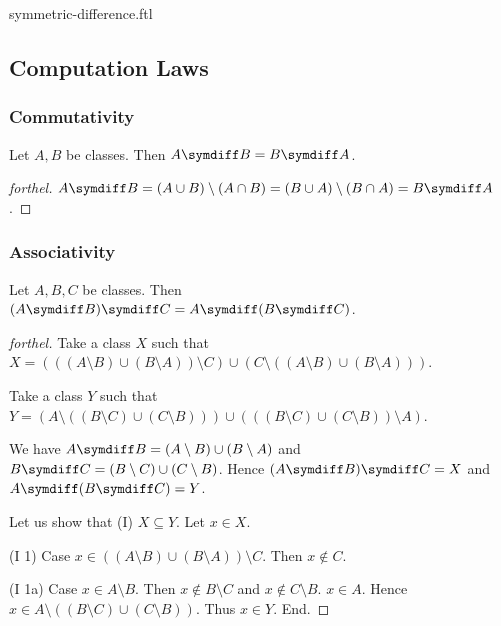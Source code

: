 \documentclass{naproche-library}
\begin{document}
\begin{smodule}{symmetric-difference.ftl}
  \subsection*{Computation Laws}

  \subsubsection*{Commutativity}

  \begin{proposition}[forthel,id=FOUNDATIONS_03_4518372049944576,printid]
    Let $A, B$ be classes.
    Then $A \symdiff B = B \symdiff A$.
  \end{proposition}
  \begin{proof}[forthel]
    $A \symdiff B
      = (A \cup B) \setminus (A \cap B)
      = (B \cup A) \setminus (B \cap A)
      = B \symdiff A$.
  \end{proof}


  \subsubsection*{Associativity}

  \begin{proposition}[forthel,id=FOUNDATIONS_03_8680845204258816,printid]
    Let $A, B, C$ be classes.
    Then $(A \symdiff B) \symdiff C = A \symdiff (B \symdiff C)$.
  \end{proposition}
  \begin{proof}[forthel]
    Take a class $X$ such that $X = (((A \setminus B) \cup (B \setminus A)) \setminus C) \cup (C \setminus ((A \setminus B) \cup (B \setminus A)))$.

    Take a class $Y$ such that $Y = (A \setminus ((B \setminus C) \cup (C \setminus B))) \cup (((B \setminus C) \cup (C \setminus B)) \setminus A)$.

    We have $A \symdiff B = (A \setminus B) \cup (B \setminus A)$ and $B \symdiff C = (B \setminus C) \cup (C \setminus B)$.
    Hence $(A \symdiff B) \symdiff C = X$ and $A \symdiff (B \symdiff C) = Y$.

    Let us show that (I) $X \subseteq Y$.
      Let $x \in X$.

      (I 1) Case $x \in ((A \setminus B) \cup (B \setminus A)) \setminus C$.
        Then $x \notin C$.

        (I 1a) Case $x \in A \setminus B$.
          Then $x \notin B \setminus C$ and $x \notin C \setminus B$. $x \in A$.
          Hence $x \in A \setminus ((B \setminus C) \cup (C \setminus B))$.
          Thus $x \in Y$.
        End.


\end{proof}
\end{smodule}
\end{document}
